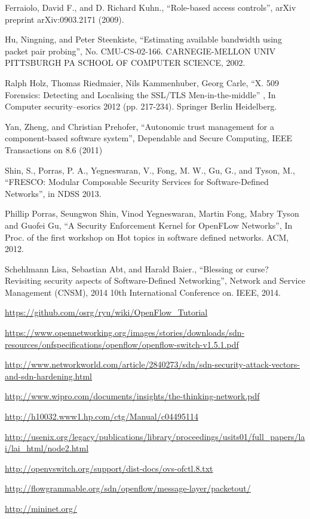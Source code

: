 \begin{thebibliography}{1}
Ferraiolo, David F., and D. Richard Kuhn., 
``Role-based access controls'', arXiv preprint arXiv:0903.2171 (2009).

\bibitem{}
Hu, Ningning, and Peter Steenkiste,
``Estimating available bandwidth using packet pair probing'', No. CMU-CS-02-166. CARNEGIE-MELLON UNIV PITTSBURGH PA SCHOOL OF COMPUTER SCIENCE, 2002.

Ralph Holz, Thomas Riedmaier, Nils Kammenhuber, Georg Carle, 
``X. 509 Forensics: Detecting and Localising the SSL/TLS Men-in-the-middle'' , In Computer security–esorics 2012 (pp. 217-234). Springer Berlin Heidelberg.

Yan, Zheng, and Christian Prehofer,
``Autonomic trust management for a component-based software system'', Dependable and Secure Computing, IEEE Transactions on 8.6 (2011)

Shin, S., Porras, P. A., Yegneswaran, V., Fong, M. W., Gu, G., and Tyson, M.,
``FRESCO: Modular Composable Security Services for Software-Defined Networks'', in NDSS 2013.

Phillip Porras, Seungwon Shin, Vinod Yegneswaran, Martin Fong, Mabry Tyson and Guofei Gu,
``A Security Enforcement Kernel for OpenFLow Networks'', In Proc. of the first workshop on Hot topics in software defined networks. ACM, 2012.

Schehlmann Lisa, Sebastian Abt, and Harald Baier., 
``Blessing or curse? Revisiting security aspects of Software-Defined Networking'', Network and Service Management (CNSM), 2014 10th International Conference on. IEEE, 2014.

\url{https://github.com/osrg/ryu/wiki/OpenFlow_Tutorial}

\url{https://www.opennetworking.org/images/stories/downloads/sdn-resources/onfspecifications/openflow/openflow-switch-v1.5.1.pdf}

\url{http://www.networkworld.com/article/2840273/sdn/sdn-security-attack-vectors-and-sdn-hardening.html}

\url{http://www.wipro.com/documents/insights/the-thinking-network.pdf}

\url{http://h10032.www1.hp.com/ctg/Manual/c04495114}

\url{http://usenix.org/legacy/publications/library/proceedings/usits01/full_papers/lai/lai_html/node2.html}

\url{http://openvswitch.org/support/dist-docs/ovs-ofctl.8.txt}

\url{http://flowgrammable.org/sdn/openflow/message-layer/packetout/}

\url{http://mininet.org/}

\end{thebibliography}